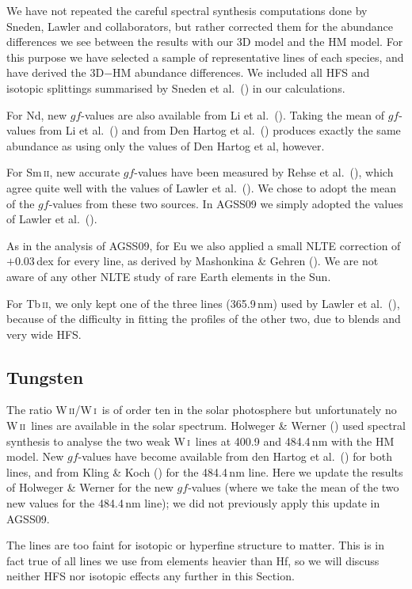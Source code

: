 \documentclass[traditabstract]{aa}
\newcommand{\altsmii}{Sm\,\textsc{ii}}
\newcommand{\alttbii}{Tb\,\textsc{ii}}
\newcommand{\altwi}{W\,\textsc{i}}
\newcommand{\altwii}{W\,\textsc{ii}}
\newcommand{\wi}{\altwi\ }
\newcommand{\wii}{\altwii\ }
\begin{document}
We have not repeated the careful spectral synthesis computations done by Sneden, Lawler and collaborators, but rather corrected them for the abundance differences we see between the results with our 3D model and the HM model. For this purpose we have selected a sample of representative lines of each species, and have derived the 3D$-$HM abundance differences. We included all HFS and isotopic splittings summarised by Sneden et al.\ (\cite{sned1}) in our calculations.

For Nd, new $gf$-values are also available from Li et al.\ (\cite{li}).  Taking the mean of $gf$-values from Li et al.\ (\cite{li}) and from Den Hartog et al.\ (\cite{den1}) produces exactly the same abundance as using only the values of Den Hartog et al, however.

For \altsmii, new accurate $gf$-values have been measured by Rehse et al.\ (\cite{reh}), which agree quite well with the values of Lawler et al.\ (\cite{law3}). We chose to adopt the mean of the $gf$-values from these two sources.  In AGSS09 we simply adopted the values of Lawler et al.\ (\cite{law3}).

As in the analysis of AGSS09, for Eu we also applied a small NLTE correction of $+0.03$\,dex for every line, as derived by Mashonkina \& Gehren (\cite{mash2}).
We are not aware of any other NLTE study of rare Earth elements in the Sun.

For \alttbii, we only kept one of the three lines (365.9\,nm) used by Lawler et al.\ (\cite{law5}), because of the difficulty in fitting the profiles of the other two, due to blends and very wide HFS.

\subsection{Tungsten}
\label{w_gfs}
The ratio \altwii/\wi is of order ten in the solar photosphere but unfortunately no \wii lines are available in the solar spectrum.  Holweger \& Werner (\cite{hol2}) used spectral synthesis to analyse the two weak \wi lines at 400.9 and 484.4\,nm with the HM model. New $gf$-values have become available from den Hartog et al.\ (\cite{denh}) for both lines, and from Kling \& Koch (\cite{klin}) for the 484.4\,nm line.  Here we update the results of Holweger \& Werner for the new $gf$-values (where we take the mean of the two new values for the 484.4\,nm line); we did not previously apply this update in AGSS09.  

The lines are too faint for isotopic or hyperfine structure to matter.  This is in fact true of all lines we use from elements heavier than Hf, so we will discuss neither HFS nor isotopic effects any further in this Section.
\end{document}
